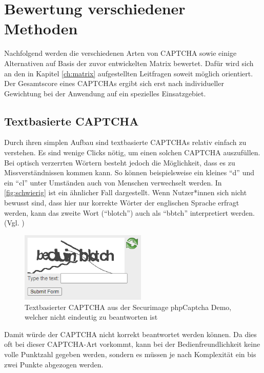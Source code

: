 \chapter{Bewertung verschiedener Methoden}
\label{ch:bewertung}

Nachfolgend werden die verschiedenen Arten von CAPTCHA sowie einige Alternativen auf Basis der zuvor entwickelten Matrix bewertet. 
Dafür wird sich an den in Kapitel \ref{ch:matrix} aufgestellten Leitfragen soweit möglich orientiert.
Der Gesamtscore eines CAPTCHAs ergibt sich erst nach individueller Gewichtung bei der Anwendung auf ein spezielles Einsatzgebiet.

\section{Textbasierte CAPTCHA}
\label{ch:bewertung:text}
Durch ihren simplen Aufbau sind textbasierte CAPTCHAs relativ einfach zu verstehen.
Es sind wenige Clicks nötig, um einen solchen CAPTCHA auszufüllen. 
Bei optisch verzerrten Wörtern besteht jedoch die Möglichkeit, dass es zu Missverständnissen kommen kann.
So können beispielsweise ein kleines ``d'' und ein ``cl'' unter Umständen auch von Menschen verwechselt werden. 
In \autoref{fig:schwierig} ist ein ähnlicher Fall dargestellt. 
Wenn Nutzer*innen sich nicht bewusst sind, dass hier nur korrekte Wörter der englischen Sprache erfragt werden,
kann das zweite Wort (``blotch'') auch als ``bbtch'' interpretiert werden. (Vgl. \cite[p.132]{Beheshti})

\begin{figure}[h!]
    \centering
    \includegraphics[width=6cm]{gfx/mygraphics/schwierig4.png}
    \caption{Textbasierter CAPTCHA aus der Securimage phpCaptcha Demo, welcher nicht eindeutig zu beantworten ist}
    \label{fig:schwierig}
\end{figure}

Damit würde der CAPTCHA nicht korrekt beantwortet werden können.
Da dies oft bei dieser CAPTCHA-Art vorkommt, kann bei der Bedienfreundlichkeit keine volle Punktzahl gegeben werden,
sondern es müssen je nach Komplexität ein bis zwei Punkte abgezogen werden.

